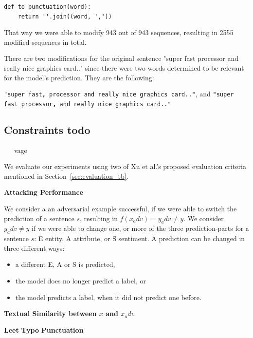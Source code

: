 \begin{lstlisting}
def to_punctuation(word):
    return ''.join((word, ','))
\end{lstlisting}

That way we were able to modify 943 out of 943 sequences, resulting in 2555 modified sequences in total. 

There are two modifications for the original sentence "super fast processor and really nice graphics card.." since there were two words determined to be relevant for the model's prediction. They are the following:

\texttt{"super fast\textbf{,} processor and really nice graphics card.."}, and
\texttt{"super fast processor\textbf{,} and really nice graphics card.."}

\subsection{Constraints todo}
    \label{sec:constraints_m}
~~~vage~~

We evaluate our experiments using two of Xu et al.'s proposed evaluation criteria mentioned in Section~\ref{sec:evaluation_tb}. 

\textbf{Attacking Performance}

We consider a an adversarial example successful, if we were able to switch the prediction of a sentence $s$, resulting in ${f(x_adv ) = y_adv \neq y}$.
We consider ${y_adv \neq y}$ if we were able to change one, or more of the three prediction-parts for a sentence $s$: E entity, A attribute, or S sentiment. 
A prediction can be changed in three different ways:
\begin{itemize}
\item a different E, A or S is predicted,
\item the model does no longer predict a label, or
\item the model predicts a label, when it did not predict one before.
\end{itemize}

\textbf{Textual Similarity between $x$ and $x_adv$}

\textbf{Leet}
\textbf{Typo}
\textbf{Punctuation}


